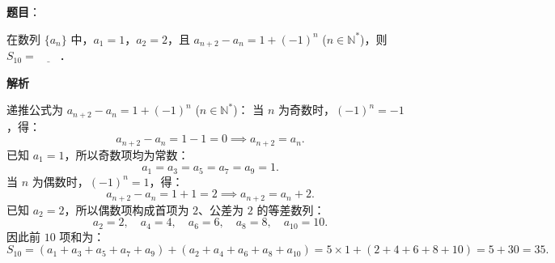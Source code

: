 \begin{answer}

\textbf{题目}：

在数列 $\{a_n\}$ 中，$a_1 = 1$，$a_2 = 2$，且 $a_{n+2} - a_n = 1 + (-1)^n$ ($n \in \mathbb{N}^*$)，则 $S_{10} = \underline{\hspace{2em}}$．

\textbf{解析}

递推公式为 $a_{n+2} - a_n = 1 + (-1)^n$ ($n \in \mathbb{N}^*$)：
当 $n$ 为奇数时，$(-1)^n = -1$，得：
\nopagebreak[4]
\[
a_{n+2} - a_n = 1 - 1 = 0 \implies a_{n+2} = a_n.
\]
已知 $a_1 = 1$，所以奇数项均为常数：
\nopagebreak[4]
\[
a_1 = a_3 = a_5 = a_7 = a_9 = 1.
\]
当 $n$ 为偶数时，$(-1)^n = 1$，得：
\nopagebreak[4]
\[
a_{n+2} - a_n = 1 + 1 = 2 \implies a_{n+2} = a_n + 2.
\]
已知 $a_2 = 2$，所以偶数项构成首项为 $2$、公差为 $2$ 的等差数列：
\nopagebreak[4]
\[
a_2 = 2, \quad a_4 = 4, \quad a_6 = 6, \quad a_8 = 8, \quad a_{10} = 10.
\]
因此前 $10$ 项和为：
\nopagebreak[4]
\[
S_{10} = (a_1 + a_3 + a_5 + a_7 + a_9) + (a_2 + a_4 + a_6 + a_8 + a_{10}) = 5 \times 1 + (2 + 4 + 6 + 8 + 10) = 5 + 30 = 35.
\]


\end{answer}
